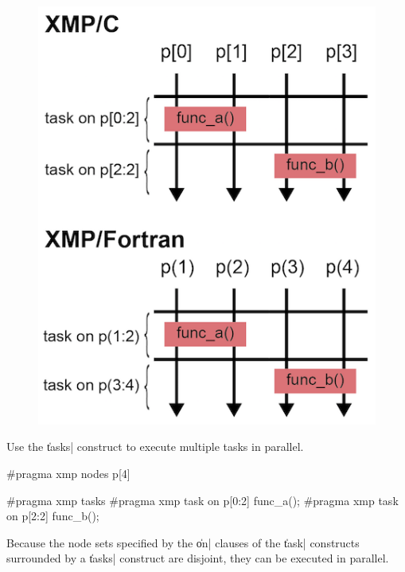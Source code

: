 \begin{figure}
  \centering
  \includegraphics{figs/task_noparallel.png}
\end{figure}

Use the \|tasks| construct to execute multiple tasks in parallel.

\begin{XCexample}
#pragma xmp nodes p[4]

#pragma xmp tasks
{
#pragma xmp task on p[0:2]
{
  func_a();
}
#pragma xmp task on p[2:2]
{
  func_b();
}
}
\end{XCexample}


Because the node sets specified by the \|on| clauses of the \|task|
constructs surrounded by a \|tasks| construct are disjoint, they can be
executed in parallel.

